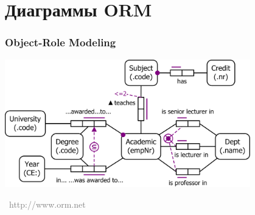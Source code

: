 \documentclass[xetex,mathserif,serif]{beamer}
\newcommand{\attribution}[1] {
	\vspace{-5mm}\begin{flushright}\begin{scriptsize}\textcolor{gray}{\textcopyright\, #1}\end{scriptsize}\end{flushright}
}
\begin{document}
	\section{Диаграммы ORM}
	
	\begin{frame}
		\frametitle{Object-Role Modeling}
		\begin{center}
			\includegraphics[width=0.8\textwidth]{orm.png}
			\attribution{http://www.orm.net}
		\end{center}
	\end{frame}
\end{document}
